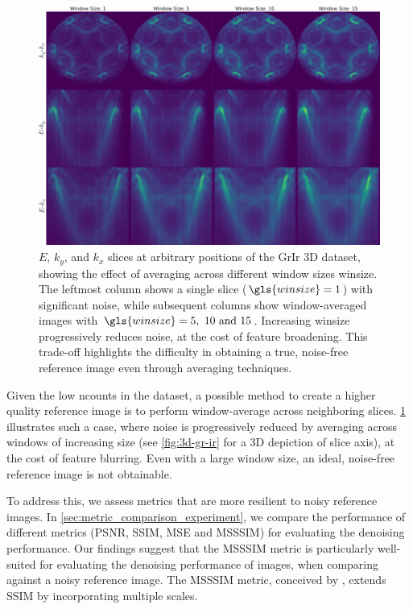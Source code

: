 \begin{figure}
    \centering
    \includegraphics[width=1\linewidth]{images/slices.pdf}
    \caption{$E$, $k_y$, and $k_x$ slices at arbitrary positions of the \gls{GrIr} 3D dataset, showing the effect of averaging across different window sizes \gls{winsize}. The leftmost column shows a single slice ($\gls{winsize}=1$) with significant noise, while subsequent columns show window-averaged images with $\gls{winsize}=\numlist{5;10;15}$. Increasing \gls{winsize} progressively reduces noise, at the cost of feature broadening. This trade-off highlights the difficulty in obtaining a true, noise-free reference image even through averaging techniques.}
    \label{fig:slices}
\end{figure}

Given the low \gls{ncounts} in the dataset, a possible method to create a higher quality reference image is to perform window-average across neighboring slices. \cref{fig:slices} illustrates such a case, where noise is progressively reduced by averaging across windows of increasing size (see \cref{fig:3d-gr-ir} for a 3D depiction of slice axis), at the cost of feature blurring. Even with a large window size, an ideal, noise-free reference image is not obtainable.

To address this, we assess metrics that are more resilient to noisy reference images. In \cref{sec:metric_comparison_experiment}, we compare the performance of different metrics (\gls{PSNR}, \gls{SSIM}, \gls{MSE} and \gls{MSSSIM}) for evaluating the denoising performance. Our findings suggest that the \gls{MSSSIM} metric is particularly well-suited for evaluating the denoising performance of images, when comparing against a noisy reference image. The \gls{MSSSIM} metric, conceived by \citeauthor{wangMultiscaleStructuralSimilarity2003} \cite{wangMultiscaleStructuralSimilarity2003}, extends SSIM by incorporating multiple scales. 

